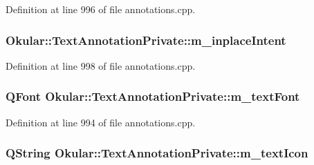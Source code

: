Definition at line 996 of file annotations.\+cpp.

\hypertarget{classOkular_1_1TextAnnotationPrivate_abf5061c7495736518eb3ded69034b9f4}{
\subsubsection[{m\+\_\+inplace\+Intent}]{ Okular\+::\+Text\+Annotation\+Private\+::m\+\_\+inplace\+Intent}}\label{classOkular_1_1TextAnnotationPrivate_abf5061c7495736518eb3ded69034b9f4}


Definition at line 998 of file annotations.\+cpp.

\hypertarget{classOkular_1_1TextAnnotationPrivate_a2b22283c721246cd6fb8438a2325d4a4}{
\subsubsection[{m\+\_\+text\+Font}]{\setlength{\rightskip}{0pt plus 5cm}Q\+Font Okular\+::\+Text\+Annotation\+Private\+::m\+\_\+text\+Font}}\label{classOkular_1_1TextAnnotationPrivate_a2b22283c721246cd6fb8438a2325d4a4}


Definition at line 994 of file annotations.\+cpp.

\hypertarget{classOkular_1_1TextAnnotationPrivate_a1df47fe4d3a7175b5536650d3d23b0f2}{
\subsubsection[{m\+\_\+text\+Icon}]{\setlength{\rightskip}{0pt plus 5cm}Q\+String Okular\+::\+Text\+Annotation\+Private\+::m\+\_\+text\+Icon}}\label{classOkular_1_1TextAnnotationPrivate_a1df47fe4d3a7175b5536650d3d23b0f2}


